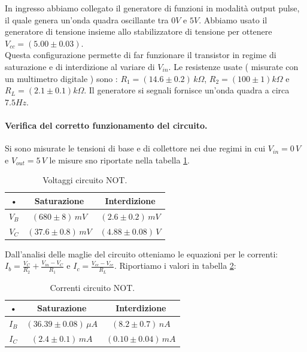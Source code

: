 \documentclass[10pt,a4paper]{article}
\begin{document}
In ingresso abbiamo collegato  il generatore di funzioni in modalità output pulse, il quale genera un’onda quadra oscillante tra $0 V$ e $5 V$. Abbiamo usato  il generatore di tensione insieme allo stabilizzatore di tensione per ottenere  $V_{cc} = (5.00 \pm 0.03)$. \\ 
Questa configurazione permette di far funzionare il transistor in regime di saturazione e di interdizione al variare di $V_{in}$. Le resistenze usate ( misurate con un multimetro digitale ) sono : $R_1=(14.6 \pm 0.2) \, k\Omega$, $R_2=(100 \pm 1) k\Omega$ e $R_L=(2.1 \pm 0.1) k\Omega$.
Il generatore si segnali fornisce un'onda quadra a circa $7.5 Hz$.

\paragraph{Verifica del corretto funzionamento del circuito.}
Si sono misurate le tensioni di base e di collettore nei due regimi in cui $V_{in} = 0 \, V$ e $V_{out} = 5 \, V$ le misure sno riportate nella tabella \ref{voltNot}.

\begin{table}[!htb]\centering
\begin{tabular}{|c|c|c|}
\hline 
• & Saturazione & Interdizione \\ 
\hline 
$V_{B}$ & $(680\pm8)\,mV$  & $(2.6\pm0.2)\,mV$ \\ 
\hline 
$V_{C}$ & $(37.6\pm0.8)\,mV$ & $(4.88\pm0.08)\,V$ \\ 
\hline 
\end{tabular}
\caption{Voltaggi circuito NOT.} \label{voltNot}
\end{table}

Dall'analisi delle maglie del circuito otteniamo le equazioni per le correnti: $I_{b} = \frac{V_{C}}{R_2} + \frac{V_{in}-V_{C}}{R_1}$ e $I_c = \frac{V_{cc}-V_{ce}}{R_L}$. Riportiamo i valori in tabella \ref{correntiNot}:

\begin{table}[!htb]\centering
\begin{tabular}{|c|c|c|}
\hline 
• & Saturazione & Interdizione \\ 
\hline 
$I_B$ & $(36.39\pm0.08) \, \mu A$ & $(8.2 \pm 0.7) \, nA$ \\ 
\hline 
$I_C$ & $(2.4 \pm 0.1)\, mA$ & $(0.10\pm0.04) \, mA$ \\ 
\hline 
\end{tabular} 
\caption{Correnti circuito NOT.} \label{correntiNot}
\end{table}
\end{document}
